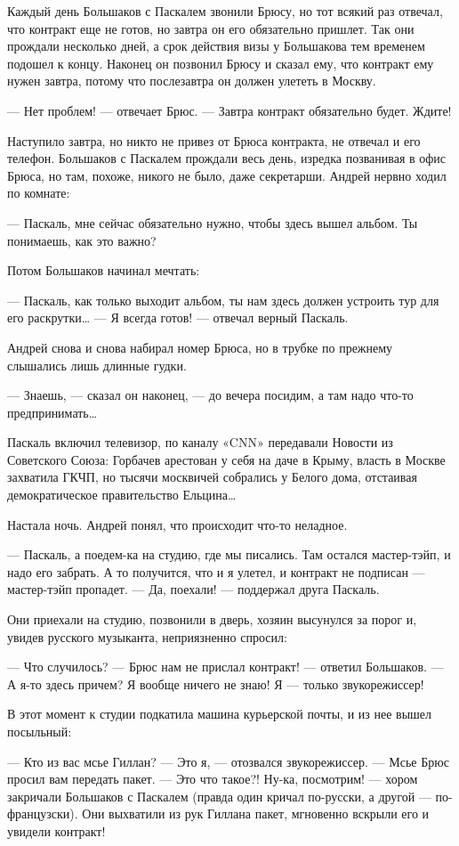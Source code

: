 \documentclass[10pt, twoside]{book}
\begin{document}
Каждый день Большаков с Паскалем звонили Брюсу, но тот всякий раз отвечал, что контракт еще не готов, но завтра он его
обязательно пришлет. Так они прождали несколько дней, а срок действия визы у Большакова тем временем подошел к концу.
Наконец он позвонил Брюсу и сказал ему, что контракт ему нужен завтра, потому что послезавтра он должен улететь в
Москву.

— Нет проблем! — отвечает Брюс. — Завтра контракт обязательно будет. Ждите!

Наступило завтра, но никто не привез от Брюса контракта, не отвечал и его телефон. Большаков с Паскалем прождали весь
день, изредка позванивая в офис Брюса, но там, похоже, никого не было, даже секретарши. Андрей нервно ходил по комнате:

— Паскаль, мне сейчас обязательно нужно, чтобы здесь вышел альбом. Ты понимаешь, как это важно?

Потом Большаков начинал мечтать:

— Паскаль, как только выходит альбом, ты нам здесь должен устроить тур для его раскрутки\ldots
— Я всегда готов! — отвечал верный Паскаль.

Андрей снова и снова набирал номер Брюса, но в трубке по прежнему слышались лишь длинные гудки.

— Знаешь, — сказал он наконец, — до вечера посидим, а там надо что-то предпринимать\ldots

Паскаль включил телевизор, по каналу «CNN» передавали Новости из Советского Союза: Горбачев арестован у себя на даче в
Крыму, власть в Москве захватила ГКЧП, но тысячи москвичей собрались у Белого дома, отстаивая демократическое
правительство Ельцина\ldots

Настала ночь. Андрей понял, что происходит что-то неладное.

— Паскаль, а поедем-ка на студию, где мы писались. Там остался мастер-тэйп, и надо его забрать. А то получится, что и я
улетел, и контракт не подписан — мастер-тэйп пропадет.
— Да, поехали! — поддержал друга Паскаль.

Они приехали на студию, позвонили в дверь, хозяин высунулся за порог и, увидев русского музыканта, неприязненно спросил:

— Что случилось?
— Брюс нам не прислал контракт! — ответил Большаков.
— А я-то здесь причем? Я вообще ничего не знаю! Я — только звукорежиссер!

В этот момент к студии подкатила машина курьерской почты, и из нее вышел посыльный:

— Кто из вас мсье Гиллан?
— Это я, — отозвался звукорежиссер.
— Мсье Брюс просил вам передать пакет.
— Это что такое?! Ну-ка, посмотрим! — хором закричали Большаков с Паскалем (правда один кричал по-русски, а другой —
по-французски). Они выхватили из рук Гиллана пакет, мгновенно вскрыли его и увидели контракт!
\end{document}
